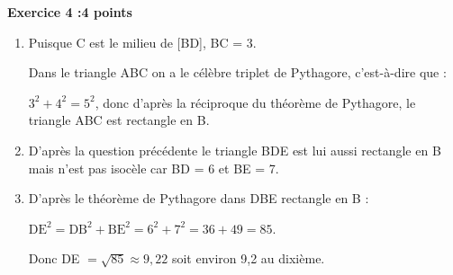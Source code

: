 \textbf{Exercice 4 :\hfill 4 points} 

\bigskip

% 
\begin{enumerate}
\item Puisque C est le milieu de [BD], BC = 3.

Dans le triangle ABC on a le célèbre triplet de Pythagore, c'est-à-dire que :

$3^2 + 4^2 = 5^2$, donc d'après la réciproque du théorème de Pythagore, le triangle ABC est rectangle en B.
\item D'après la question précédente le triangle BDE est lui aussi rectangle en B mais n'est pas isocèle car BD = 6 et BE = 7.
\item D'après le théorème de Pythagore dans DBE rectangle en B :

$\text{DE}^2 = \text{DB}^2 + \text{BE}^2 = 6^2 + 7^2 = 36 + 49 = 85$.

Donc DE $ = \sqrt{85} \approx 9,22$ soit environ 9,2 au dixième.
\end{enumerate}

\bigskip 

